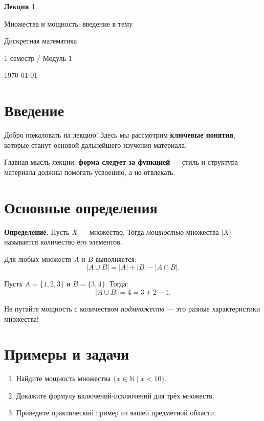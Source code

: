 \documentclass[11pt,a4paper]{article}
\newcommand{\term}[1]{\textcolor{primary}{\textbf{#1}}}
\newcommand{\hl}[1]{\colorbox{highlight!60}{#1}}
\newcommand{\makelecturetitle}[4]{%
\begin{titlepage}
\centering
\vspace*{3cm}
{\LARGE\bfseries #3\par}
\vspace{0.8cm}
{\Large #4\par}
\vspace{2cm}
{\large #1\par}
\vspace{0.3cm}
{\normalsize #2\par}
\vfill
{\normalsize \today\par}
\vspace{1cm}
\end{titlepage}
}
\begin{document}
\makelecturetitle
  {Дискретная математика}
  {1 семестр / Модуль 1}
  {Лекция 1}
  {Множества и мощность: введение в тему}

\section{Введение}

Добро пожаловать на лекцию! Здесь мы рассмотрим \term{ключевые понятия},
которые станут основой дальнейшего изучения материала.

\begin{keyidea}
Главная мысль лекции: \textbf{форма следует за функцией} — стиль и структура
материала должны помогать усвоению, а не отвлекать.
\end{keyidea}

\section{Основные определения}

\begin{definition}
\term{Определение.} Пусть $X$ — множество. Тогда \emph{мощностью}
множества $|X|$ называется количество его элементов.
\end{definition}

\begin{theorem}
Для любых множеств $A$ и $B$ выполняется:
\[
  |A \cup B| = |A| + |B| - |A \cap B|.
\]
\end{theorem}

\begin{example}
Пусть $A = \{1,2,3\}$ и $B = \{3,4\}$. Тогда:
\[
  |A \cup B| = 4 = 3 + 2 - 1.
\]
\end{example}

\begin{important}
Не путайте \hl{мощность} с количеством \emph{подмножеств} — это разные
характеристики множества!
\end{important}

\section{Примеры и задачи}

\begin{enumerate}
  \item Найдите мощность множества $\{x \in \mathbb{N} \mid x < 10\}$.
  \item Докажите формулу включений-исключений для трёх множеств.
  \item Приведите практический пример из вашей предметной области.
\end{enumerate}
\end{document}
